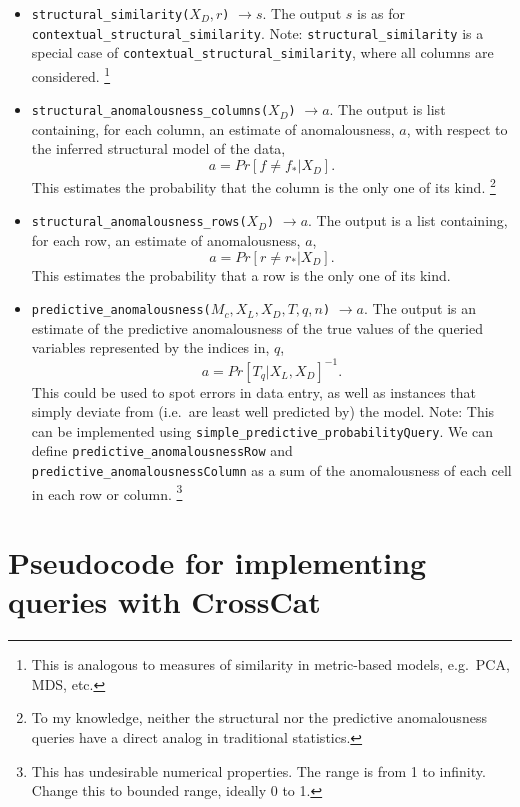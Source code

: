 \documentclass[11pt]{article}
\begin{document}
\begin{itemize}
\item \texttt{structural\_similarity($X_D, r$)} $\rightarrow s$. The output $s$ is as for \texttt{contextual\_structural\_similarity}. 
Note: \texttt{structural\_similarity} is a special case of \texttt{contextual\_structural\_similarity}, where all columns are considered.
\footnote{This is analogous to measures of similarity in metric-based models, e.g.\ PCA, MDS, etc.}

\item \texttt{structural\_anomalousness\_columns($X_D$)} $\rightarrow a$. The output is list containing, for each column, an estimate of anomalousness, $a$, with respect to the inferred structural model of the data,
$$
a = Pr[ f \ne f_*  | X_D].
$$
This estimates the probability that the column is the only one of its kind.
\footnote{To my knowledge, neither the structural nor the predictive anomalousness queries have a direct analog in traditional statistics.}

\item \texttt{structural\_anomalousness\_rows($X_D$)} $\rightarrow a$. The output is a list containing, for each row, an estimate of  anomalousness, $a$,
$$
a = Pr[ r \ne r_* | X_D].
$$
This estimates the probability that a row is the only one of its kind.

\item \texttt{predictive\_anomalousness($M_c, X_L, X_D, T, q, n$)} $\rightarrow a$. The output is an estimate of the predictive anomalousness of the true values of the queried variables represented by the indices in, $q$, 
$$
a = Pr[T_q | X_L, X_D]^{-1}.
$$
This could be used to spot errors in data entry, as well as instances that simply deviate from (i.e.\ are least well predicted by) the model. Note: This can be implemented using \texttt{simple\_predictive\_probabilityQuery}.
We can define \texttt{predictive\_anomalousnessRow} and  \texttt{predictive\_anomalousnessColumn} as a sum of the anomalousness of each cell in each row or column.
\footnote{This has undesirable numerical properties. The range is from 1 to infinity. Change this to bounded range, ideally 0 to 1.}

\end{itemize}

\section{Pseudocode for implementing queries with CrossCat}%
\end{document}
